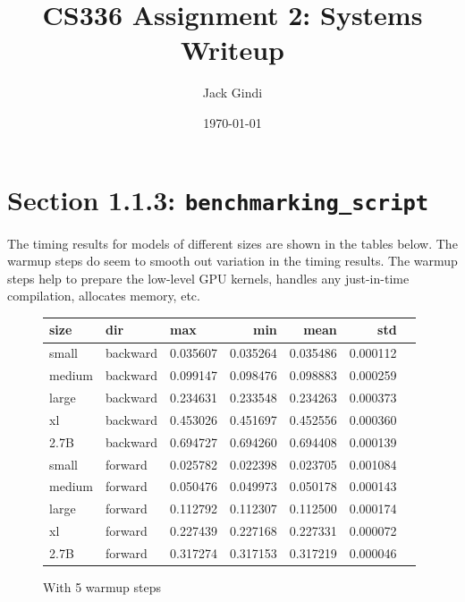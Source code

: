 \documentclass[11pt, letterpaper]{article}
\title{CS336 Assignment 2: Systems Writeup}
\author{Jack Gindi}
\date{\today}
\begin{document}
\maketitle

\section*{Section 1.1.3: \texttt{benchmarking\_script}}
The timing results for models of different sizes are shown in the tables below. The warmup steps do seem to smooth out variation in the timing results. The warmup steps help to prepare the low-level GPU kernels, handles any just-in-time compilation, allocates memory, etc.

\begin{figure}[h]
\centering
\begin{tabular}{lllrrrr}
\toprule
size & dir & max & min & mean & std \\
\midrule
small & backward & 0.035607 & 0.035264 & 0.035486 & 0.000112 \\
medium & backward & 0.099147 & 0.098476 & 0.098883 & 0.000259 \\
large & backward & 0.234631 & 0.233548 & 0.234263 & 0.000373 \\
xl & backward & 0.453026 & 0.451697 & 0.452556 & 0.000360 \\
2.7B & backward & 0.694727 & 0.694260 & 0.694408 & 0.000139 \\
small & forward & 0.025782 & 0.022398 & 0.023705 & 0.001084 \\
medium & forward & 0.050476 & 0.049973 & 0.050178 & 0.000143 \\
large & forward & 0.112792 & 0.112307 & 0.112500 & 0.000174 \\
xl & forward & 0.227439 & 0.227168 & 0.227331 & 0.000072 \\
2.7B & forward & 0.317274 & 0.317153 & 0.317219 & 0.000046 \\
\bottomrule
\end{tabular}
\caption{With 5 warmup steps}
\label{warmup}
\end{figure}
\end{document}
